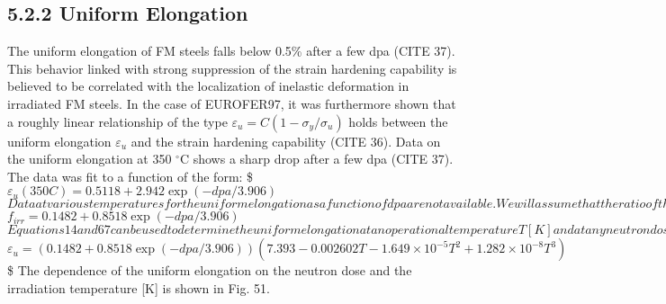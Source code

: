 \documentclass[letterpaper,10pt,english]{jupyterBook}
\begin{document}
	\subsection{5.2.2 Uniform Elongation}
	\label{\detokenize{5 Radiation Effects on Mechanical Properties:uniform-elongation}}
	\sphinxAtStartPar
	The uniform elongation of FM steels falls below 0.5\% after a few dpa (CITE 37). This behavior linked with strong suppression of the strain hardening capability is believed to be correlated with the localization of inelastic deformation in irradiated FM steels. In the case of EUROFER97, it was furthermore shown that a roughly linear relationship of the type \(\varepsilon_u=C(1-\sigma_y/\sigma_u)\) holds between the uniform elongation \(\varepsilon_u\) and the strain hardening capability (CITE 36). Data on the uniform elongation at 350 \(^\circ\)C shows a sharp drop after a few dpa (CITE 37). The data was fit to a function of the form:
	\$\( \varepsilon_u(350C)=0.5118 +2.942\exp(- dpa/3.906) \)\(
	Data at various temperatures for the uniform elongation as a function of dpa are not available. We will assume that the ratio of the irradiated to the unirradiated value of the uniform elongation remains the same for any other temperature. The ratio is thus given by:
	\)\(f_{irr}= 0.1482 +0.8518\exp(- dpa/3.906)\)\(
	Equations 14 and 67 can be used to determine the uniform elongation at an operational temperature T [K] and at any neutron dose [dpa]. The functional dependence is thus given by:
	\)\( \varepsilon_u=(0.1482 +0.8518\exp(- dpa/3.906))(7.393-0.002602 T-1.649\times 10^{-5} T^2 +1.282\times 10^{-8} T^3) \)\$
	The dependence of the uniform elongation on the neutron dose and the irradiation temperature {[}K{]} is shown in Fig. 51.
	
\end{document}
